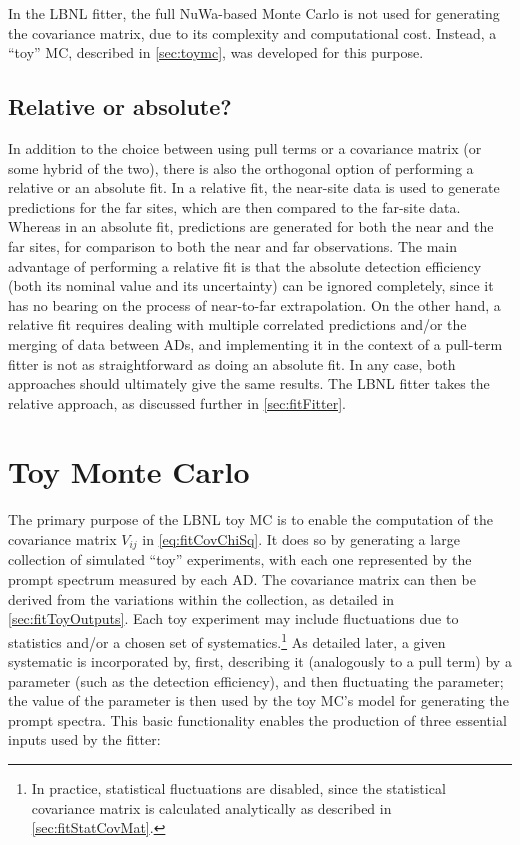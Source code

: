 \documentclass[../thesis.tex]{subfiles}
\begin{document}
In the LBNL fitter, the full NuWa-based Monte Carlo is not used for generating the covariance matrix, due to its complexity and computational cost. Instead, a ``toy'' MC, described in \autoref{sec:toymc}, was developed for this purpose.

\subsection{Relative or absolute?}
\label{sec:fitRelOrAbs}

In addition to the choice between using pull terms or a covariance matrix (or some hybrid of the two), there is also the orthogonal option of performing a relative or an absolute fit. In a relative fit, the near-site data is used to generate predictions for the far sites, which are then compared to the far-site data. Whereas in an absolute fit, predictions are generated for both the near and the far sites, for comparison to both the near and far observations. The main advantage of performing a relative fit is that the absolute detection efficiency (both its nominal value and its uncertainty) can be ignored completely, since it has no bearing on the process of near-to-far extrapolation. On the other hand, a relative fit requires dealing with multiple correlated predictions and/or the merging of data between ADs, and implementing it in the context of a pull-term fitter is not as straightforward as doing an absolute fit. In any case, both approaches should ultimately give the same results. The LBNL fitter takes the relative approach, as discussed further in \autoref{sec:fitFitter}.

\section{Toy Monte Carlo}
\label{sec:toymc}

The primary purpose of the LBNL toy MC \cite{berkeley_toymc} is to enable the computation of the covariance matrix $V_{ij}$ in \autoref{eq:fitCovChiSq}. It does so by generating a large collection of simulated ``toy'' experiments, with each one represented by the prompt spectrum measured by each AD. The covariance matrix can then be derived from the variations within the collection, as detailed in \autoref{sec:fitToyOutputs}. Each toy experiment may include fluctuations due to statistics and/or a chosen set of systematics.\footnote{In practice, statistical fluctuations are disabled, since the statistical covariance matrix is calculated analytically as described in \autoref{sec:fitStatCovMat}.} As detailed later, a given systematic is incorporated by, first, describing it (analogously to a pull term) by a parameter (such as the detection efficiency), and then fluctuating the parameter; the value of the parameter is then used by the toy MC's model for generating the prompt spectra. This basic functionality enables the production of three essential inputs used by the fitter:
\end{document}
